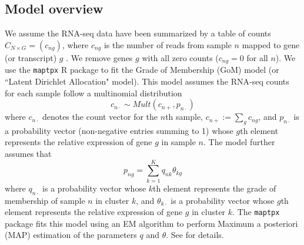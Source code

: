 \subsection{Model overview}

We assume the RNA-seq data have been summarized by a table of counts $C_{N \times G} = (c_{ng})$, where $c_{ng}$ is the number of reads from sample $n$ mapped to gene (or transcript) $g$ \cite{oshlack.etal.genomebiology}.  We remove genes $g$ with all zero counts ($c_{ng}=0$ for all $n$).
We use the {\tt maptpx} R package \cite{taddy} to fit the Grade of Membership (GoM) model (or ``Latent Dirichlet Allocation" model). This model assumes the RNA-seq counts for each sample follow a multinomial distribution
\begin{equation}
c_{n\cdot} \sim Mult(c_{n+}, p_{n\cdot})
\end{equation}
where $c_{n\cdot}$ denotes the count vector for the $n$th sample, $c_{n+} := \sum_g c_{ng}$, and $p_{n\cdot}$ is a probability vector (non-negative entries summing to 1) whose $g$th element represents the relative expression of gene $g$ in sample $n$. 
The model further assumes that 
\begin{equation}
p_{ng} = \sum_{k=1}^{K} q_{nk}\theta_{kg}    
\end{equation}
where $q_{n\cdot}$ is a probability vector whose $k$th element represents the grade of membership of
sample $n$ in cluster $k$, and $\theta_{k\cdot}$ is a probability vector whose $g$th element represents
the relative expression of gene $g$ in cluster $k$. The {\tt maptpx} package fits this model using an EM algorithm to perform Maximum a posteriori (MAP)  estimation of the parameters $q$ and $\theta$. See \cite{Taddy2012} for details.


%
%

